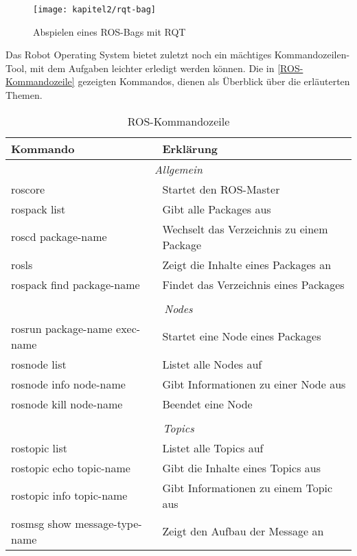\begin{figure}[t]
  \centering
  \texttt{[image: kapitel2/rqt-bag]}
  \caption{Abspielen eines ROS-Bags mit RQT}
  \label{Kap2:ROSBag}
\end{figure}

Das Robot Operating System bietet zuletzt noch ein mächtiges Kommandozeilen-Tool, mit dem Aufgaben leichter erledigt werden können. Die in \autoref{ROS-Kommandozeile} gezeigten Kommandos, dienen als Überblick über die erläuterten Themen. \autocite{learningROSForRoboticsProgramming} \autocite{gentleIntroductionToROS}
\begin{table}[b]
  \caption{ROS-Kommandozeile}
  \label{ROS-Kommandozeile}
  \renewcommand{\arraystretch}{1.2}
  \centering
  \sffamily
  \begin{footnotesize}
    \begin{tabular}{l l}
    \toprule
    \textbf{Kommando} & \textbf{Erklärung}\\
    \midrule
    \multicolumn{2}{c}{\textit{Allgemein}}\\
    roscore & Startet den ROS-Master\\
    rospack list & Gibt alle Packages aus\\
    roscd package-name & Wechselt das Verzeichnis zu einem Package\\
    rosls & Zeigt die Inhalte eines Packages an\\
    rospack find package-name & Findet das Verzeichnis eines Packages\\
    \multicolumn{2}{l}{}\\
    \multicolumn{2}{c}{\textit{Nodes}}\\
    rosrun package-name exec-name & Startet eine Node eines Packages\\
    rosnode list & Listet alle Nodes auf\\
    rosnode info node-name & Gibt Informationen zu einer Node aus\\
    rosnode kill node-name & Beendet eine Node\\
    \multicolumn{2}{l}{}\\
    \multicolumn{2}{c}{\textit{Topics}}\\
    rostopic list & Listet alle Topics auf\\
    rostopic echo topic-name & Gibt die Inhalte eines Topics aus\\
    rostopic info topic-name & Gibt Informationen zu einem Topic aus\\
    rosmsg show message-type-name & Zeigt den Aufbau der Message an\\

\end{tabular}
\end{footnotesize}
\end{table}
